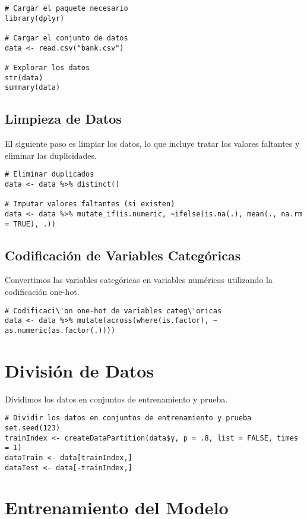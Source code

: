 \documentclass[a4paper]{report} %
\begin{document}
\begin{verbatim}
# Cargar el paquete necesario
library(dplyr)

# Cargar el conjunto de datos
data <- read.csv("bank.csv")

# Explorar los datos
str(data)
summary(data)
\end{verbatim}

\subsection{Limpieza de Datos}

El siguiente paso es limpiar los datos, lo que incluye tratar los valores faltantes y eliminar las duplicidades.

\begin{verbatim}
# Eliminar duplicados
data <- data %>% distinct()

# Imputar valores faltantes (si existen)
data <- data %>% mutate_if(is.numeric, ~ifelse(is.na(.), mean(., na.rm = TRUE), .))
\end{verbatim}

\subsection{Codificaci\'on de Variables Categ\'oricas}

Convertimos las variables categ\'oricas en variables num\'ericas utilizando la codificaci\'on one-hot.

\begin{verbatim}
# Codificaci\'on one-hot de variables categ\'oricas
data <- data %>% mutate(across(where(is.factor), ~ as.numeric(as.factor(.))))
\end{verbatim}

\section{Divisi\'on de Datos}

Dividimos los datos en conjuntos de entrenamiento y prueba.

\begin{verbatim}
# Dividir los datos en conjuntos de entrenamiento y prueba
set.seed(123)
trainIndex <- createDataPartition(data$y, p = .8, list = FALSE, times = 1)
dataTrain <- data[trainIndex,]
dataTest <- data[-trainIndex,]
\end{verbatim}

\section{Entrenamiento del Modelo}
\end{document}

